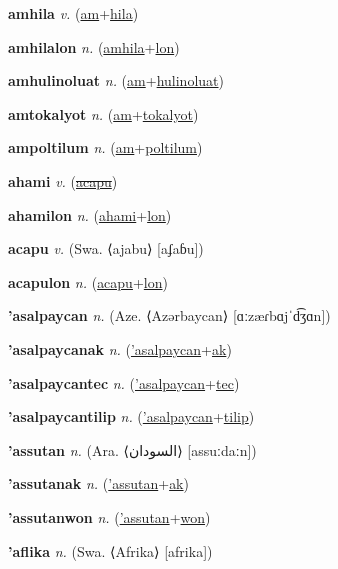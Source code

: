\textbf{\hypertarget{amhila}{amhila}} \textit{v.} (\hyperlink{am}{am}+\allowbreak \hyperlink{hila}{hila})


\textbf{\hypertarget{amhilalon}{amhilalon}} \textit{n.} (\hyperlink{amhila}{amhila}+\allowbreak \hyperlink{lon}{lon})


\textbf{\hypertarget{amhulinoluat}{amhulinoluat}} \textit{n.} (\hyperlink{am}{am}+\allowbreak \hyperlink{hulinoluat}{hulinoluat})


\textbf{\hypertarget{amtokalyot}{amtokalyot}} \textit{n.} (\hyperlink{am}{am}+\allowbreak \hyperlink{tokalyot}{tokalyot})


\textbf{\hypertarget{ampoltilum}{ampoltilum}} \textit{n.} (\hyperlink{am}{am}+\allowbreak \hyperlink{poltilum}{poltilum})


\textbf{\hypertarget{ahami}{ahami}} \textit{v.} (\hyperlink{acapu}{\sout{acapu}})


\textbf{\hypertarget{ahamilon}{ahamilon}} \textit{n.} (\hyperlink{ahami}{ahami}+\allowbreak \hyperlink{lon}{lon})


\textbf{\hypertarget{acapu}{acapu}} \textit{v.} (Swa. ⟨ajabu⟩ [aʄaɓu])


\textbf{\hypertarget{acapulon}{acapulon}} \textit{n.} (\hyperlink{acapu}{acapu}+\allowbreak \hyperlink{lon}{lon})


\textbf{\hypertarget{'asalpaycan}{'asalpaycan}} \textit{n.} (Aze. ⟨Azərbaycan⟩ [ɑːzæɾbɑjˈd͡ʒɑn])


\textbf{\hypertarget{'asalpaycanak}{'asalpaycanak}} \textit{n.} (\hyperlink{'asalpaycan}{'asalpaycan}+\allowbreak \hyperlink{ak}{ak})


\textbf{\hypertarget{'asalpaycantec}{'asalpaycantec}} \textit{n.} (\hyperlink{'asalpaycan}{'asalpaycan}+\allowbreak \hyperlink{tec}{tec})


\textbf{\hypertarget{'asalpaycantilip}{'asalpaycantilip}} \textit{n.} (\hyperlink{'asalpaycan}{'asalpaycan}+\allowbreak \hyperlink{tilip}{tilip})


\textbf{\hypertarget{'assutan}{'assutan}} \textit{n.} (Ara. ⟨{\arabics{}السودان‎}⟩ [assuːdaːn])


\textbf{\hypertarget{'assutanak}{'assutanak}} \textit{n.} (\hyperlink{'assutan}{'assutan}+\allowbreak \hyperlink{ak}{ak})


\textbf{\hypertarget{'assutanwon}{'assutanwon}} \textit{n.} (\hyperlink{'assutan}{'assutan}+\allowbreak \hyperlink{won}{won})


\textbf{\hypertarget{'aflika}{'aflika}} \textit{n.} (Swa. ⟨Afrika⟩ [afrika])



